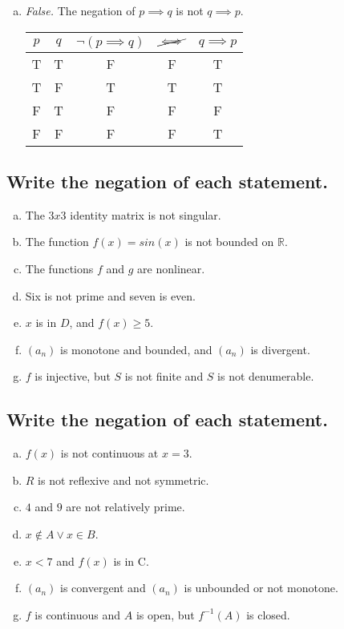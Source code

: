 \documentclass[12pt]{scrartcl} %
\begin{document}
\begin{enumerate}[(a)]
	\item \emph{False.} The negation of $p \implies q$ is not $q \implies p$.
	\begin{center}
	\begin{tabular}{*{2}{c}|*{3}{c}}$p$&$q$&$\neg(p \implies q)$&$
	\cancel{\iff} $&$q \implies p$\\
\hline
T&T&F&F&T\\
T&F&T&T&T\\
F&T&F&F&F\\
F&F&F&F&T\\
\end{tabular}\end{center}
\end{enumerate}
\subsection{Write the negation of each statement.}
\begin{enumerate}[(a)]
	\item The $3x3$ identity matrix is not singular.
	\item The function $f(x)=sin(x)$ is not bounded on $\mathbb{R}$.
	\item The functions $f$ and $g$ are nonlinear.
	\item Six is not prime and seven is even.
	\item $x$ is in $D$, and $f(x) \geq 5$.
	\item $(a_n)$ is monotone and bounded, and $(a_n)$ is divergent.
	\item $f$ is injective, but $S$ is not finite and $S$ is not denumerable.
\end{enumerate}
\subsection{Write the negation of each statement.}
\begin{enumerate}[(a)]
	\item $f(x)$ is not continuous at $x=3$.
	\item $R$ is not reflexive and not symmetric.
	\item $4$ and $9$ are not relatively prime.
	\item $x \notin A \lor x \in B$.
	\item $x < 7$ and $f(x)$ is in C.
	\item $(a_n)$ is convergent and $(a_n)$ is unbounded or not monotone.
	\item $f$ is continuous and $A$ is open, but $f^{-1}(A)$ is closed.
\end{enumerate}
\end{document}
